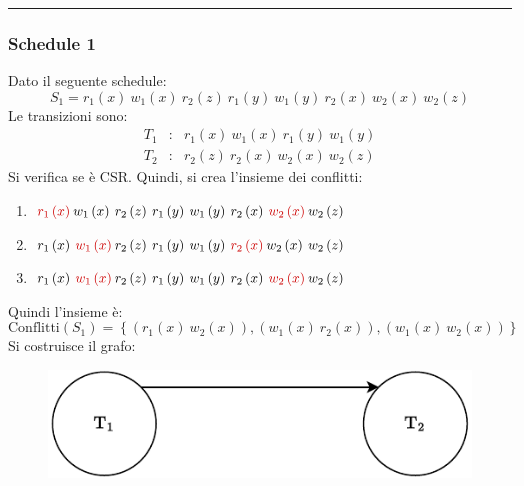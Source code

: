 \documentclass[a4paper]{article}
\newcommand{\longline}{\noindent\rule{\textwidth}{0.4pt}}
\begin{document}
	\longline
	
	\subsubsection{Schedule 1}
	
	Dato il seguente schedule:
	\begin{equation*}
		S_{1} = r_{1}\left(x\right) \: w_{1}\left(x\right) \: r_{2}\left(z\right) \: r_{1}\left(y\right) \: w_{1}\left(y\right) \: r_{2}\left(x\right) \: w_{2}\left(x\right) \: w_{2}\left(z\right)
	\end{equation*}
	Le transizioni sono:
	\begin{equation*}
		\begin{array}{lll}
			T_{1} &:& r_{1}\left(x\right) \: w_{1}\left(x\right) \: r_{1}\left(y\right) \: w_{1}\left(y\right) \\
			T_{2} &:& r_{2}\left(z\right) \: r_{2}\left(x\right) \: w_{2}\left(x\right) \: w_{2}\left(z\right)
		\end{array}
	\end{equation*}
	Si verifica se è CSR. Quindi, si crea l'insieme dei conflitti:
	\begin{enumerate}
		\item $\textcolor{Red3}{r_{1}\left(x\right)} \: w_{1}\left(x\right) \: r_{2}\left(z\right) \: r_{1}\left(y\right) \: w_{1}\left(y\right) \: r_{2}\left(x\right) \: \textcolor{Red3}{w_{2}\left(x\right)} \: w_{2}\left(z\right)$
		
		\item $r_{1}\left(x\right) \: \textcolor{Red3}{w_{1}\left(x\right)} \: r_{2}\left(z\right) \: r_{1}\left(y\right) \: w_{1}\left(y\right) \: \textcolor{Red3}{r_{2}\left(x\right)} \: w_{2}\left(x\right) \: w_{2}\left(z\right)$
		
		\item $r_{1}\left(x\right) \: \textcolor{Red3}{w_{1}\left(x\right)} \: r_{2}\left(z\right) \: r_{1}\left(y\right) \: w_{1}\left(y\right) \: r_{2}\left(x\right) \: \textcolor{Red3}{w_{2}\left(x\right)} \: w_{2}\left(z\right)$
	\end{enumerate}
	Quindi l'insieme è:
	\begin{equation*}
		\text{Conflitti}\left(S_{1}\right) = \left\{\left(r_{1}\left(x\right) \: w_{2}\left(x\right)\right), \left(w_{1}\left(x\right) \: r_{2}\left(x\right)\right), \left(w_{1}\left(x\right) \: w_{2}\left(x\right)\right)\right\}
	\end{equation*}
	Si costruisce il grafo:
	\begin{figure}[!htp]
		\centering
		\includegraphics[width=.55\textwidth]{img/NoSR-VSR-CSR-1.pdf}
	\end{figure}
	
\end{document}
